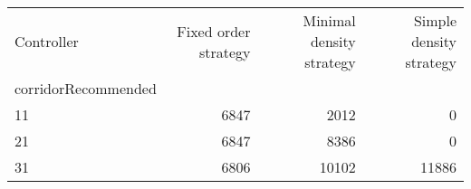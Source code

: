 \begin{tabular}{lrrr}
\toprule
Controller & Fixed order strategy & Minimal density strategy & Simple density strategy \\
corridorRecommended &  &  &  \\
\midrule
11 & 6847 & 2012 & 0 \\
21 & 6847 & 8386 & 0 \\
31 & 6806 & 10102 & 11886 \\
\bottomrule
\end{tabular}
